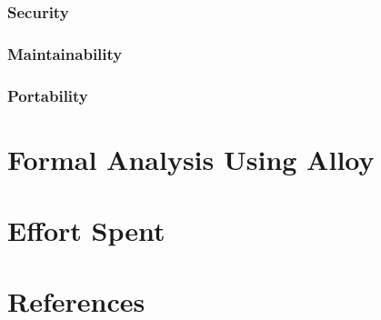 \documentclass[a4paper]{article}
\begin{document}
\subsubsection{Security}

\subsubsection{Maintainability}

\subsubsection{Portability}

\section{Formal Analysis Using Alloy}

\section{Effort Spent}

\section{References}
\end{document}
